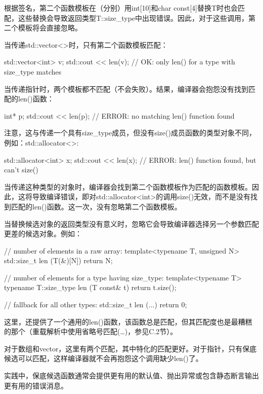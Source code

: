 根据签名，第二个函数模板在（分别）用int[10]和char const[4]替换T时也会匹配，这些替换会导致返回类型T::size\_type中出现错误。因此，对于这些调用，第二个模板将会直接忽略。

当传递std::vector<>时，只有第二个函数模板匹配：

\begin{cpp}
std::vector<int> v;
std::cout << len(v); // OK: only len() for a type with size_type matches
\end{cpp}

当传递指针时，两个模板都不匹配（不会失败）。结果，编译器会抱怨没有找到匹配的len()函数：

\begin{cpp}
int* p;
std::cout << len(p); // ERROR: no matching len() function found
\end{cpp}

注意，这与传递一个具有size\_type成员，但没有size()成员函数的类型对象不同，例如：std::allocator<>:

\begin{cpp}
std::allocator<int> x;
std::cout << len(x); // ERROR: len() function found, but can't size()
\end{cpp}

当传递这种类型的对象时，编译器会找到第二个函数模板作为匹配的函数模板。因此，这将导致编译错误，即对std::allocator<int>的调用size()无效，而不是没有找到匹配的len()函数。这一次，没有忽略第二个函数模板。

当替换候选对象的返回类型没有意义时，忽略它会导致编译器选择另一个参数匹配更差的候选对象。例如：

\begin{cpp}
// number of elements in a raw array:
template<typename T, unsigned N>
std::size_t len (T(&)[N])
{
	return N;
}

// number of elements for a type having size_type:
template<typename T>
typename T::size_type len (T const& t)
{
	return t.size();
}

// fallback for all other types:
std::size_t len (...)
{
	return 0;
}
\end{cpp}

这里，还提供了一个通用的len()函数，该函数总是匹配，但其匹配度也是最糟糕的那个（重载解析中使用省略号匹配(…)，参见C.2节）。

对于数组和vector，这里有两个匹配，其中特化的匹配更好。对于指针，只有保底候选可以匹配，这样编译器就不会再抱怨这个调用缺少len()了。

\begin{notice}
实践中，保底候选函数通常会提供更有用的默认值、抛出异常或包含静态断言输出更有用的错误消息。
\end{notice}


